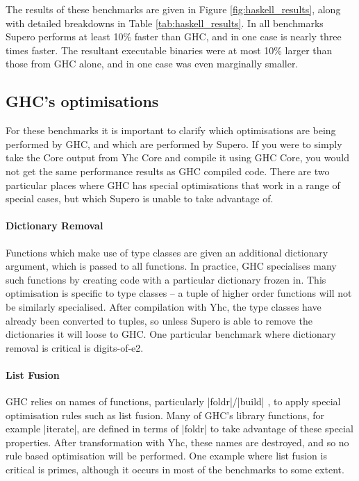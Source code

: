 \documentclass{llncs}
\begin{document}
The results of these benchmarks are given in Figure \ref{fig:haskell_results}, along with detailed breakdowns in Table \ref{tab:haskell_results}. In all benchmarks Supero performs at least 10\% faster than GHC, and in one case is nearly three times faster. The resultant executable binaries were at most 10\% larger than those from GHC alone, and in one case was even marginally smaller.

\subsection{GHC's optimisations}

For these benchmarks it is important to clarify which optimisations are being performed by GHC, and which are performed by Supero. If you were to simply take the Core output from Yhc Core and compile it using GHC Core, you would not get the same performance results as GHC compiled code. There are two particular places where GHC has special optimisations that work in a range of special cases, but which Supero is unable to take advantage of.

\paragraph{Dictionary Removal} Functions which make use of type classes are given an additional dictionary argument, which is passed to all functions. In practice, GHC specialises many such functions by creating code with a particular dictionary frozen in. This optimisation is specific to type classes -- a tuple of higher order functions will not be similarly specialised. After compilation with Yhc, the type classes have already been converted to tuples, so unless Supero is able to remove the dictionaries it will loose to GHC. One particular benchmark where dictionary removal is critical is digits-of-e2.

\paragraph{List Fusion} GHC relies on names of functions, particularly |foldr|/|build| \cite{spj:rules}, to apply special optimisation rules such as list fusion. Many of GHC's library functions, for example |iterate|, are defined in terms of |foldr| to take advantage of these special properties. After transformation with Yhc, these names are destroyed, and so no rule based optimisation will be performed. One example where list fusion is critical is primes, although it occurs in most of the benchmarks to some extent.
\end{document}
